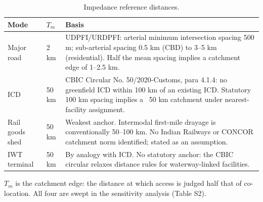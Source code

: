\begin{table}[htbp]
\centering
\small
\caption{Impedance reference distances.}
\label{tab:t4_reference}
\begin{tabular}{lll}
\toprule
Mode & $T_m$ & Basis \\
\midrule
Major road & 2 km & UDPFI/URDPFI: arterial minimum intersection spacing 500 m; sub-arterial spacing 0.5 km (CBD) to 3–5 km (residential). Half the mean spacing implies a catchment edge of 1–2.5 km. \\
ICD & 50 km & CBIC Circular No. 50/2020-Customs, para 4.1.4: no greenfield ICD within 100 km of an existing ICD. Statutory 100 km spacing implies a ~50 km catchment under nearest-facility assignment. \\
Rail goods shed & 50 km & Weakest anchor. Intermodal first-mile drayage is conventionally 50–100 km. No Indian Railways or CONCOR catchment norm identified; stated as an assumption. \\
IWT terminal & 50 km & By analogy with ICD. No statutory anchor: the CBIC circular relaxes distance rules for waterway-linked facilities. \\
\bottomrule
\end{tabular}
\begin{tablenotes}\footnotesize
\item $T_m$ is the catchment edge: the distance at which access is judged half that of co-location. All four are swept in the sensitivity analysis (Table S2).
\end{tablenotes}
\end{table}
